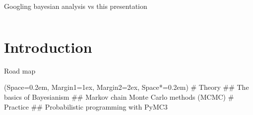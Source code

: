 \documentclass[12pt, aspectratio=149]{beamer}
\newcommand{\listSpace}{0.2em}
\theoremstyle{plain}
\begin{document}
\begin{frame}[fragile]{Googling bayesian analysis vs this presentation}
\begin{columns}
\begin{column}{0.5\linewidth}
	\end{column}
	\end{columns}
\end{frame}

\section{Introduction}
\begin{frame}[fragile]{Road map}
	\begin{easylist}[enumerate]
		\ListProperties(Space=\listSpace, Margin1=1ex, Margin2=2ex, Space*=\listSpace)
		# Theory
		## The basics of Bayesianism
		## Markov chain Monte Carlo methods (MCMC)
		# Practice
		## Probabilistic programming with PyMC3
	\end{easylist}
\end{frame}
\end{document}
